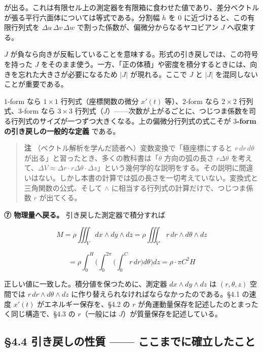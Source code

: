 \documentclass[a4paper,12pt,openany]{book}
\begin{document}
が出る。これは有限セル上の測定器を有限箱に食わせた値であり、差分ベクトルが張る平行六面体については等式である。分割幅
\(h\) を \(0\) に近づけると、この有限行列式を
\(\Delta u\,\Delta v\,\Delta w\)
で割った係数が、偏微分からなるヤコビアン \(J\) へ収束する。

\(J\)
が負なら向きが反転していることを意味する。形式の引き戻しでは、この符号を持った
\(J\)
をそのまま使う。一方、「正の体積」や密度を積分するときには、向きを忘れた大きさが必要になるため
\(|J|\) が現れる。ここで \(J\) と \(|J|\) を混同しないことが重要である。

\(1\)-form なら \(1 \times 1\) 行列式（座標関数の微分 \(x'(t)\)
等）、\(2\)-form なら \(2 \times 2\) 行列式、\(3\)-form なら
\(3 \times 3\)
行列式（\(J\)）——次数が上がるごとに、つじつま係数を司る行列式のサイズが一つずつ大きくなる。上の偏微分行列式の式こそが
\textbf{$3$-form の引き戻しの一般的な定義} である。

\begin{quote}
\textbf{注} （ベクトル解析を学んだ読者へ）変数変換で「極座標にすると
\(r\,dr\,d\theta\) が出る」と習ったとき、多くの教科書は「\(\theta\)
方向の弧の長さ \(r\Delta\theta\)
を考えて、\(\Delta V \approx \Delta r \cdot r\Delta\theta \cdot \Delta z\)」という幾何学的な説明をする。その説明に間違いはない。しかし本書の計算では弧の長さを一切考えていない。変換式と三角関数の公式、そして
\(\wedge\) に相当する行列式の計算だけで、つじつま係数 \(r\) が出てくる。
\end{quote}

\textbf{⑦ 物理量へ戻る。} 引き戻した測定器で積分すれば

\[
M
=
\rho\iiint_V dx\wedge dy\wedge dz
=
\rho\iiint_{V'} r\,dr\wedge d\theta\wedge dz
\]

\[
=
\rho
\int_0^H
\biggl(
  \int_0^{2\pi}
  \biggl(
    \int_0^C r\,dr
  \biggr)
  d\theta
\biggr)
dz
=
\rho\cdot\pi C^2H
\]

正しい値に一致した。積分値を保つために、測定器
\(dx \wedge dy \wedge dz\) は \((r,\theta,z)\) 空間では
\(r\,dr \wedge d\theta \wedge dz\)
に作り替えられなければならなかったのである。§4.1 の速度 \(x'(t)\)
がエネルギー保存を、§4.2 の \(r\)
が角運動量保存を記述したのとまったく同じ構造で、§4.3 の \(r\)（一般には
\(J\)）が質量保存を記述している。

\hypertarget{ux5f15ux304dux623bux3057ux306eux6027ux8cea-ux3053ux3053ux307eux3067ux306bux78baux7acbux3057ux305fux3053ux3068}{%
\subsection{§4.4 引き戻しの性質 ——
ここまでに確立したこと}\label{ux5f15ux304dux623bux3057ux306eux6027ux8cea-ux3053ux3053ux307eux3067ux306bux78baux7acbux3057ux305fux3053ux3068}}
\end{document}
